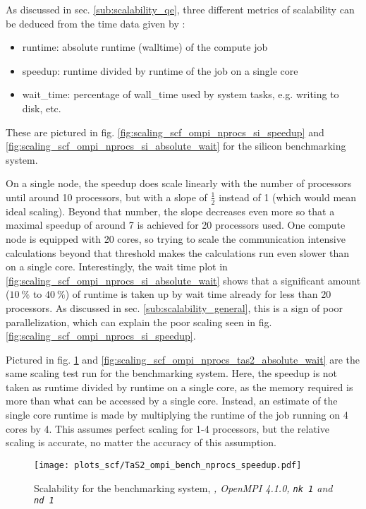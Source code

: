 \documentclass[main.tex]{subfiles}
\begin{document}
As discussed in sec. \ref{sub:scalability_qe}, three different metrics of scalability can be deduced from the time data given by \QE:
\begin{itemize}
    \item runtime: absolute runtime (walltime) of the compute job
    \item speedup: runtime divided by runtime of the job on a single core
    \item \gls{wait_time}: percentage of \gls{wall_time} used by system tasks, e.g. writing to disk, etc.
\end{itemize}
These are pictured in fig. \ref{fig:scaling_scf_ompi_nprocs_si_speedup} and \ref{fig:scaling_scf_ompi_nprocs_si_absolute_wait} for the silicon benchmarking system.

On a single node, the speedup does scale linearly with the number of processors until around 10 processors, but with a slope of \(\frac{1}{2}\) instead of 1 (which would mean ideal scaling).
Beyond that number, the slope decreases even more so that a maximal speedup of around 7 is achieved for 20 processors used.
One compute node is equipped with 20 cores, so trying to scale the communication intensive calculations beyond that threshold makes the calculations run even slower than on a single core.
Interestingly, the wait time plot in \ref{fig:scaling_scf_ompi_nprocs_si_absolute_wait} shows that a significant amount (\(\SI{10}{\percent}\) to \(\SI{40}{\percent}\)) of runtime is taken up by wait time already for less than 20 processors.
As discussed in sec. \ref{sub:scalability_general}, this is a sign of poor parallelization, which can explain the poor scaling seen in fig. \ref{fig:scaling_scf_ompi_nprocs_si_speedup}.

Pictured in fig. \ref{fig:scaling_scf_ompi_nprocs_tas2_speedup} and \ref{fig:scaling_scf_ompi_nprocs_tas2_absolute_wait} are the same scaling test run for the \TaS benchmarking system.
Here, the speedup is not taken as runtime divided by runtime on a single core, as the memory required is more than what can be accessed by a single core.
Instead, an estimate of the single core runtime is made by multiplying the runtime of the job running on 4 cores by 4.
This assumes perfect scaling for 1-4 processors, but the relative scaling is accurate, no matter the accuracy of this assumption.

\begin{figure}[ht!]
\centering
\texttt{[image: plots\_scf/TaS2\_ompi\_bench\_nprocs\_speedup.pdf]}
\caption{Scalability for the \TaS benchmarking system, \emph{, OpenMPI 4.1.0, \texttt{nk 1} and \texttt{nd 1}}}
\label{fig:scaling_scf_ompi_nprocs_tas2_speedup}
\end{figure}
\end{document}
